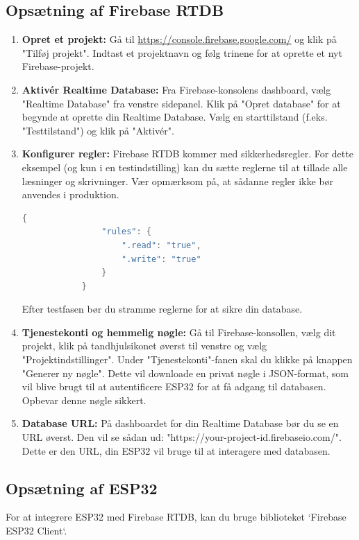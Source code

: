 \documentclass[12pt,a4paper]{book}
\begin{document}
	\subsection*{Opsætning af Firebase RTDB}
	\begin{enumerate}
		\item \textbf{Opret et projekt:} Gå til \url{https://console.firebase.google.com/} og klik på "Tilføj projekt". Indtast et projektnavn og følg trinene for at oprette et nyt Firebase-projekt.
		
		\item \textbf{Aktivér Realtime Database:} Fra Firebase-konsolens dashboard, vælg "Realtime Database" fra venstre sidepanel. Klik på "Opret database" for at begynde at oprette din Realtime Database. Vælg en starttilstand (f.eks. "Testtilstand") og klik på "Aktivér".
		
		\item \textbf{Konfigurer regler:} Firebase RTDB kommer med sikkerhedsregler. For dette eksempel (og kun i en testindstilling) kan du sætte reglerne til at tillade alle læsninger og skrivninger. Vær opmærksom på, at sådanne regler ikke bør anvendes i produktion.
		\begin{lstlisting}[language=C++]
			{
				"rules": {
					".read": "true",
					".write": "true"
				}
			}
		\end{lstlisting}
		Efter testfasen bør du stramme reglerne for at sikre din database.
		
		\item \textbf{Tjenestekonti og hemmelig nøgle:} Gå til Firebase-konsollen, vælg dit projekt, klik på tandhjulsikonet øverst til venstre og vælg "Projektindstillinger". Under "Tjenestekonti"-fanen skal du klikke på knappen "Generer ny nøgle". Dette vil downloade en privat nøgle i JSON-format, som vil blive brugt til at autentificere ESP32 for at få adgang til databasen. Opbevar denne nøgle sikkert.
		
		\item \textbf{Database URL:} På dashboardet for din Realtime Database bør du se en URL øverst. Den vil se sådan ud: "https://your-project-id.firebaseio.com/". Dette er den URL, din ESP32 vil bruge til at interagere med databasen.
	\end{enumerate}
	
	\subsection*{Opsætning af ESP32}
	For at integrere ESP32 med Firebase RTDB, kan du bruge biblioteket `Firebase ESP32 Client`.
	
\end{document}
